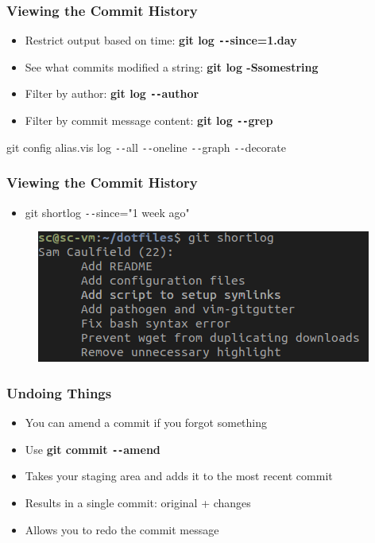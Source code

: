 \documentclass{beamer}
\begin{document}
\begin{frame}
	\frametitle{Viewing the Commit History}
	\begin{itemize}
		\item{Restrict output based on time: \textbf{git log \texttt{-{}-}since=1.day}}
		\item{See what commits modified a string: \textbf{git log -Ssomestring}}
		\item{Filter by author: \textbf{git log \texttt{-{}-}author}}
		\item{Filter by commit message content: \textbf{git log \texttt{-{}-}grep}}
	\end{itemize}

	\begin{tcolorbox}[colback=green!5,colframe=green!40!black,title=Pro Tip]git config alias.vis log \texttt{-{}-}all \texttt{-{}-}oneline \texttt{-{}-}graph \texttt{-{}-}decorate
	\end{tcolorbox}

\end{frame}

\begin{frame}
	\frametitle{Viewing the Commit History}
	\begin{itemize}
		\item{git shortlog \texttt{-{}-}since="1 week ago"}
	\end{itemize}
	\begin{figure}
		\includegraphics[scale=0.6]{shortlog.png}
	\end{figure}
\end{frame}

\begin{frame}
	\frametitle{Undoing Things}
	\begin{itemize}
		\item{You can amend a commit if you forgot something}
		\item{Use \textbf{git commit \texttt{-{}-}amend}}
		\item{Takes your staging area and adds it to the most recent commit}
		\item{Results in a single commit: original + changes}
		\item{Allows you to redo the commit message}
	\end{itemize}
\end{frame}
\end{document}
